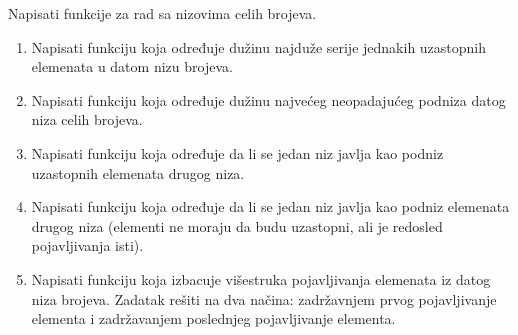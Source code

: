 \ifresenja
\begin{Answer}[ref=pv.bez_resenja_5]
\end{Answer}
\fi




\begin{Exercise}[label=pv.bez_resenja_6] 
Napisati funkcije za rad sa nizovima celih brojeva. 
\begin{enumerate}
\item Napisati funkciju koja određuje dužinu najduže serije jednakih uzastopnih elemenata
u datom nizu brojeva.
\item Napisati funkciju koja određuje dužinu najvećeg neopadajućeg podniza datog niza celih
  brojeva. 
\item Napisati funkciju koja određuje da li se jedan niz javlja kao podniz uzastopnih elemenata drugog niza.
\item Napisati funkciju koja određuje da li se jedan niz javlja kao podniz elemenata drugog niza (elementi ne moraju da budu uzastopni, ali je redosled pojavljivanja isti).  
\item Napisati funkciju koja izbacuje višestruka pojavljivanja elemenata iz datog niza
  brojeva. Zadatak rešiti na dva načina: zadržavnjem prvog pojavljivanje elementa i zadržavanjem poslednjeg pojavljivanje elementa.  
\end{enumerate}
\end{Exercise}

\ifresenja
\begin{Answer}[ref=pv.bez_resenja_6]
\end{Answer}
\fi


